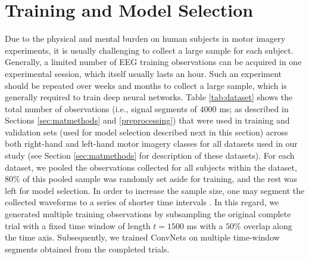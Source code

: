 \documentclass{ieeeaccess}
\begin{document}
    
\section{Training and Model Selection}
 \label{modelselect}
    
    
Due to the physical and mental burden on human subjects in motor imagery experiments, it is usually challenging to collect a large sample for each subject. Generally, a limited number of EEG training observations can be acquired in one experimental session, which itself usually lasts an hour. Such an experiment should be repeated over weeks and months to collect a large sample, which is generally required to train deep neural networks. Table \ref{tab:dataset} shows the total number of observations (i.e.,  signal segments of 4000 ms; as described in Sections \ref{sec:matmethods} and \ref{preprocessing}) that were used in training and validation sets (used for model selection described next in this section) across both right-hand and left-hand motor imagery classes for all datasets used in our study (see Section \ref{sec:matmethods} for description of these datasets).  {For each dataset, we pooled the observations collected for all subjects within the dataset, 80\% of this pooled sample was randomly set aside for training, and the rest was left for model selection. In order to increase the sample size, one may segment the collected waveforms to a series of shorter time intervals \cite{schirrmeister2017deep, Kay2013}}. In this regard, we generated multiple training observations by subsampling the original complete trial with a fixed time window of length $t = 1500$ ms with a $50\%$ overlap along the time axis. Subsequently, we trained ConvNets on multiple time-window segments obtained from the completed trials. 
    
\end{document}
